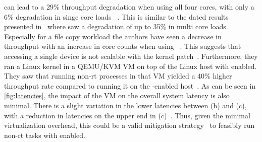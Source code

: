 \documentclass[10pt,twocolumn,a4paper]{article}
\begin{document}
 can lead to a 29\% throughput degradation when using all four cores, with only a 6\% degradation in singe core loads ~\cite{li_performance_2023}.
This is similar to the dated results presented in~\cite{reghenzani_realtime_2019} where \citeauthor{reghenzani_realtime_2019} saw a degradation of up to 35\% in multi core loads.
Especially for a file copy workload the authors have seen a decrease in throughput with an increase in core counts when using ~\cite{li_performance_2023}.
This suggests that accessing a single device is not scalable with the kernel patch~\cite{li_performance_2023}.
Furthermore, they ran a Linux kernel in a QEMU/KVM VM on top of the Linux host with  enabled.
They saw that running non-\acrshort{rt} processes in that VM yielded a 40\% higher throughput rate compared to running it on the -enabled host~\cite{li_performance_2023}.
As can be seen in \autoref{fig:latencies}, the impact of the VM on the overall system latency is also minimal.
There is a slight variation in the lower latencies between (b) and (c), with a reduction in latencies on the upper end in (c)~\cite{li_performance_2023}.
Thus, given the minimal virtualization overhead, this could be a valid mitigation strategy~\cite{li_performance_2023} to feasibly run non-\acrshort{rt} tasks with  enabled.
\end{document}
